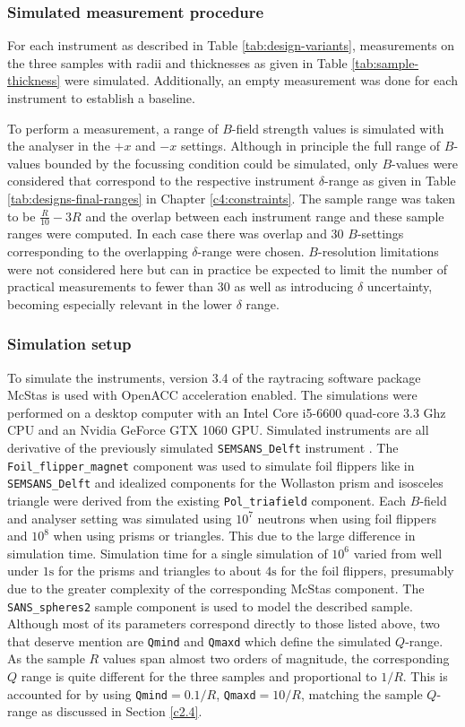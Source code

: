 \documentclass{article}
\begin{document}
\subsubsection{Simulated measurement procedure}
For each instrument as described in Table \ref{tab:design-variants}, measurements on the three samples with radii and thicknesses as given in Table \ref{tab:sample-thickness} were simulated. Additionally, an empty measurement was done for each instrument to establish a baseline. 

To perform a measurement, a range of $B$-field strength values is simulated with the analyser in the $+x$ and $-x$ settings. Although in principle the full range of $B$-values bounded by the focussing condition could be simulated, only $B$-values were considered that correspond to the respective instrument $\delta$-range as given in Table \ref{tab:designs-final-ranges} in Chapter \ref{c4:constraints}. The sample range was taken to be $\frac{R}{10} - 3R$ and the overlap between each instrument range and these sample ranges were computed. In each case there was overlap and 30 $B$-settings corresponding to the overlapping $\delta$-range were chosen. $B$-resolution limitations were not considered here but can in practice be expected to limit the number of practical measurements to fewer than 30 as well as introducing $\delta$ uncertainty, becoming especially relevant in the lower $\delta$ range. 

\subsubsection{Simulation setup}
To simulate the instruments, version 3.4 of the raytracing software package McStas \cite{willendrup2020} is used with OpenACC acceleration enabled. The simulations were performed on a desktop computer with an Intel Core i5-6600 quad-core 3.3 Ghz CPU and an Nvidia GeForce GTX 1060 GPU. Simulated instruments are all derivative of the previously simulated \texttt{SEMSANS\_Delft} instrument \cite{bouwman2021b}. The \texttt{Foil\_flipper\_magnet} component was used to simulate foil flippers like in \texttt{SEMSANS\_Delft} and idealized components for the Wollaston prism and isosceles triangle were derived from the existing \texttt{Pol\_triafield} component. Each $B$-field and analyser setting was simulated using $10^7$ neutrons when using foil flippers and $10^8$ when using prisms or triangles. This due to the large difference in simulation time. Simulation time for a single simulation of $10^6$ varied from well under $1\unit{\second}$ for the prisms and triangles to about $4\unit{\second}$ for the foil flippers, presumably due to the greater complexity of the corresponding McStas component. 
The \texttt{SANS\_spheres2} sample component is used to model the described sample. Although most of its parameters correspond directly to those listed above, two that deserve mention are \texttt{Qmind} and \texttt{Qmaxd} which define the simulated $Q$-range. As the sample $R$ values span almost two orders of magnitude, the corresponding $Q$ range is quite different for the three samples and proportional to $1/R$. This is accounted for by using \texttt{Qmind}$=0.1/R$, \texttt{Qmaxd}$=10/R$, matching the sample $Q$-range as discussed in Section \ref{c2.4}.
\end{document}
